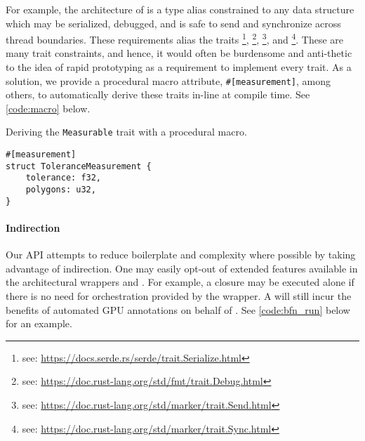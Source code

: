 For example, the architecture of  is a type alias constrained to any data structure which may be serialized, debugged, and is safe to send and synchronize across thread boundaries. These requirements alias the traits \footnote{see: \href{https://docs.serde.rs/serde/trait.Serialize.html}{https://docs.serde.rs/serde/trait.Serialize.html}}, \footnote{see: \href{https://doc.rust-lang.org/std/fmt/trait.Debug.html}{https://doc.rust-lang.org/std/fmt/trait.Debug.html}}, \footnote{see: \href{https://doc.rust-lang.org/std/marker/trait.Send.html}{https://doc.rust-lang.org/std/marker/trait.Send.html}}, and \footnote{see: \href{https://doc.rust-lang.org/std/marker/trait.Sync.html}{https://doc.rust-lang.org/std/marker/trait.Sync.html}}. These are many trait constraints, and hence, it would often be burdensome and anti-thetic to the idea of rapid prototyping as a requirement to implement every trait. As a solution, we provide a procedural macro attribute, \texttt{#[measurement]}, among others, to automatically derive these traits in-line at compile time. See \cref{code:macro} below.\medskip

\begin{snippet}
\caption{Deriving the \texttt{Measurable} trait with a procedural macro.}\label{code:macro}
\begin{verbatim}
#[measurement]
struct ToleranceMeasurement {
    tolerance: f32,
    polygons: u32,
}
\end{verbatim}
\end{snippet}

\paragraph{Indirection}
Our API attempts to reduce boilerplate and complexity where possible by taking advantage of indirection. One may easily opt-out of extended features available in the architectural wrappers  and . For example, a  closure may be executed alone if there is no need for  orchestration provided by the  wrapper. A  will still incur the benefits of automated GPU annotations on behalf of \toolname. See \cref{code:bfn_run} below for an example.\medskip

